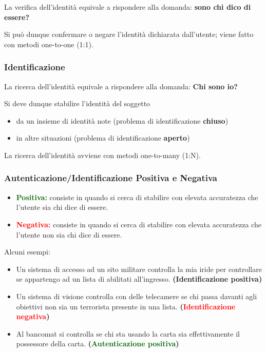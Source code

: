\documentclass{report}
\begin{document}
La verifica dell'identità equivale a rispondere alla domanda: \textbf{sono chi dico di essere?}

\noindent Si può dunque confermare o negare l'identità dichiarata dall'utente; viene fatto con metodi one-to-one (1:1).

\subsubsection{Identificazione}

La ricerca dell'identità equivale a rispondere alla domanda: \textbf{Chi sono io?}

Si deve dunque stabilire l'identità del soggetto
\begin{itemize}
    \item da un insieme di identità note (problema di identificazione \textbf{chiuso})
    \item in altre situazioni (problema di identificazione \textbf{aperto})
\end{itemize}
La ricerca dell'identità avviene con metodi one-to-many (1:N).

\subsubsection{Autenticazione/Identificazione Positiva e Negativa}

\begin{itemize}
    \item \textbf{\textcolor{darkgreen}{Positiva:}} consiste in quando si cerca di stabilire con elevata accuratezza che l'utente sia chi dice di essere.
    \item \textbf{\textcolor{red}{Negativa:}} consiste in quando si cerca di stabilire con elevata accuratezza che l'utente non sia chi dice di essere.
\end{itemize}

Alcuni esempi:
\begin{itemize}
    \item Un sistema di accesso ad un sito militare controlla la mia iride
    per controllare se appartengo ad un lista di abilitati all’ingresso. \textbf{(Identificazione positiva)}
    \item Un sistema di visione controlla con delle telecamere se chi
    passa davanti agli obiettivi non sia un terrorista presente in
    una lista. \textbf{(\textcolor{red}{Identificazione negativa})}
    \item Al bancomat si controlla se chi sta usando la carta sia
    effettivamente il possessore della carta. \textbf{(\textcolor{darkgreen}{Autenticazione positiva})}
\end{itemize}
\end{document}
